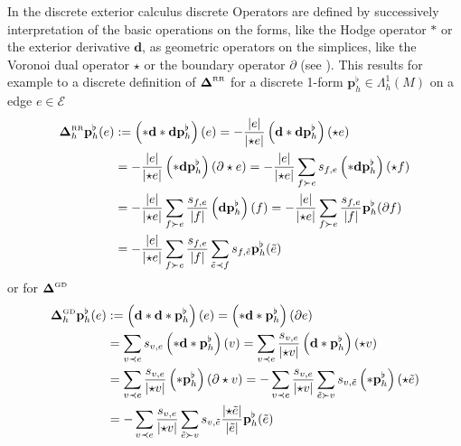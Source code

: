 \documentclass[a4paper,11pt]{scrartcl}
\newcommand{\exd}{\mathbf{d}}
\newcommand{\pflh}{\mathbf{p}^{\flat}_{h}}
\newcommand{\LB}{\boldsymbol{\Delta}^{\text{\tiny RR}}}
\newcommand{\LCB}{\boldsymbol{\Delta}^{\text{\tiny GD}}}
\newcommand{\LBh}{\LB_{h}}
\newcommand{\LCBh}{\LCB_{h}}
\newcommand{\E}{\mathcal{E}}
\begin{document}
    In the discrete exterior calculus discrete Operators are defined by successively interpretation of the basic operations on the forms, 
    like the Hodge operator \( * \) or the exterior derivative \( \exd \), as geometric operators on the simplices, 
    like the Voronoi dual operator \( \star \) or the boundary operator \( \partial \) (see \cite{hirani}).
    This results for example to a discrete definition of \( \LB \) for a discrete 1-form \( \pflh\in\Lambda^{1}_{h}(M) \) on a edge 
    \(e\in\E \)
    \begin{align}
      \LBh\pflh(e) &:=  \left(*\exd*\exd \pflh\right)(e)
                     = -\frac{\left| e \right|}{\left| \star e \right|} \left(\exd * \exd  \pflh\right)(\star e) \\
                    &=  -\frac{\left| e \right|}{\left| \star e \right|} \left(* \exd  \pflh\right)(\partial\star e)
                     = -\frac{\left| e \right|}{\left| \star e \right|} \sum_{f\succ e} s_{f,e} \left(* \exd \pflh\right) (\star f) \\
                    &= -\frac{\left| e \right|}{\left| \star e \right|} \sum_{f\succ e} \frac{s_{f,e}}{\left| f \right|} 
                                \left(\exd\pflh\right)(f)
                     = -\frac{\left| e \right|}{\left| \star e \right|} \sum_{f\succ e} \frac{s_{f,e}}{\left| f \right|} \pflh(\partial f)\\
                    &= -\frac{\left| e \right|}{\left| \star e \right|} \sum_{f\succ e} \frac{s_{f,e}}{\left| f \right|}
                                \sum_{\tilde{e}\prec f} s_{f,\tilde{e}} \pflh(\tilde{e})
    \end{align}
    or for \( \LCB \)
    \begin{align}
      \LCBh\pflh(e) &:= \left( \exd * \exd * \pflh\right) (e)
                      = \left( * \exd *\pflh \right) (\partial e) \\
                     &= \sum_{v\prec e} s_{v,e} \left( * \exd * \pflh \right)(v) 
                      = \sum_{v\prec e} \frac{s_{v,e}}{\left| \star v \right|} \left( \exd * \pflh \right)(\star v)\\
                     &= \sum_{v\prec e} \frac{s_{v,e}}{\left| \star v \right|} \left( * \pflh \right)(\partial\star v)
                      = -\sum_{v\prec e} \frac{s_{v,e}}{\left| \star v \right|} \sum_{\tilde{e}\succ v}
                                s_{v,\tilde{e}} \left( * \pflh \right) (\star \tilde{e}) \\
                     &= -\sum_{v\prec e} \frac{s_{v,e}}{\left| \star v \right|} \sum_{\tilde{e}\succ v}
                                s_{v,\tilde{e}} \frac{\left| \star\tilde{e} \right|}{\left| \tilde{e} \right|}\pflh(\tilde{e})
    \end{align}
\end{document}
